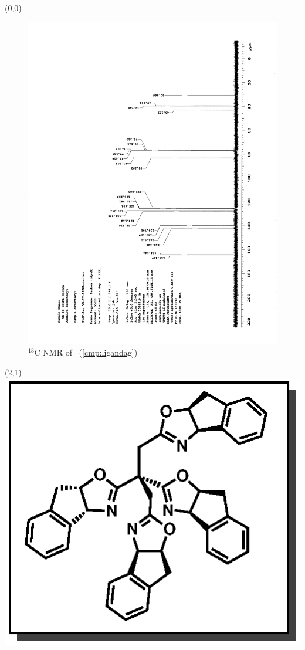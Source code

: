 \clearpage
\begin{textblock}{20}(0,0)
\begin{figure}[htb]
\caption{$^{13}$C NMR of  \CMPligandag\ (\ref{cmp:ligandag})}
\includegraphics[scale=0.75, trim = 0mm 0mm 0mm 5mm,
clip]{chp_asymmetric/images/nmr/ligandagC}
\vspace{-100pt}
\end{figure}
\end{textblock}
\begin{textblock}{1}(2,1)
\includegraphics[scale=0.8, angle=90]{chp_asymmetric/images/ligandag}
\end{textblock}
